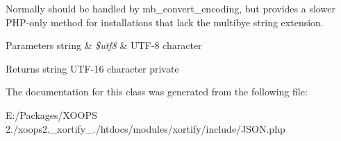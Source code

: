 Normally should be handled by mb\-\_\-convert\-\_\-encoding, but provides a slower P\-H\-P-\/only method for installations that lack the multibye string extension.


\begin{DoxyParams}[1]{Parameters}
string & {\em \$utf8} & U\-T\-F-\/8 character \\
\hline
\end{DoxyParams}
\begin{DoxyReturn}{Returns}
string U\-T\-F-\/16 character  private 
\end{DoxyReturn}


The documentation for this class was generated from the following file\-:\begin{DoxyCompactItemize}
\item 
E\-:/\-Packages/\-X\-O\-O\-P\-S 2./xoops2.\-\_\-xortify\-\_./htdocs/modules/xortify/include/J\-S\-O\-N.\-php\end{DoxyCompactItemize}
